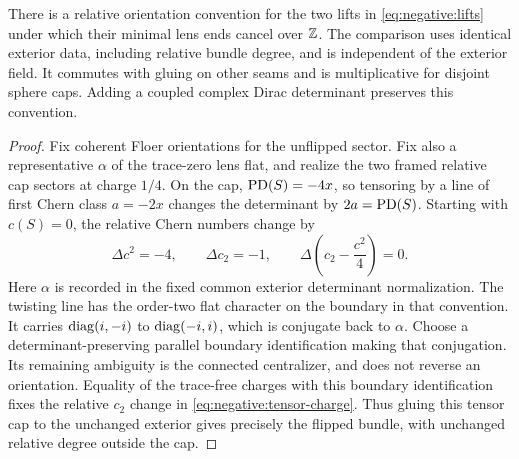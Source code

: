 \begin{proposition}\label{prop:negative:local-sign}
There is a relative orientation convention for the two lifts in
\eqref{eq:negative:lifts} under which their minimal lens ends cancel
over $\mathbb Z$.  The comparison uses identical exterior data, including
relative bundle degree, and is independent of the exterior field.
It commutes with gluing on other seams and is multiplicative for
disjoint sphere caps.  Adding a coupled complex Dirac determinant
preserves this convention.
\end{proposition}

\begin{proof}
Fix coherent Floer orientations for the unflipped sector.  Fix also a
representative $\alpha$ of the trace-zero lens flat, and realize the
two framed relative cap sectors at charge $1/4$.  On the cap,
$\operatorname{PD}(S)=-4x$, so tensoring by a line of first Chern class $a=-2x$
changes the determinant by $2a=\operatorname{PD}(S)$.  Starting with $c(S)=0$,
the relative Chern numbers change by
\begin{equation}\label{eq:negative:tensor-charge}
 \Delta c^2=-4,\qquad \Delta c_2=-1,\qquad
 \Delta\left(c_2-\frac{c^2}{4}\right)=0.
\end{equation}
Here $\alpha$ is recorded in the fixed common exterior determinant
normalization.  The twisting line has the order-two flat character
on the boundary in that convention.
It carries $\operatorname{diag}(i,-i)$ to $\operatorname{diag}(-i,i)$, which is conjugate back
to $\alpha$.  Choose a determinant-preserving parallel boundary
identification making that conjugation.  Its remaining ambiguity is
the connected centralizer, and does not reverse an orientation.
Equality of the trace-free charges with this boundary identification
fixes the relative $c_2$ change in \eqref{eq:negative:tensor-charge}.
Thus gluing this tensor cap to the unchanged exterior gives precisely
the flipped bundle, with unchanged relative degree outside the cap.


\end{proof}
